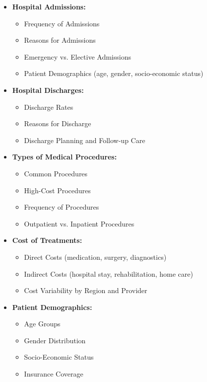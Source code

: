 \documentclass{article}
\begin{document}
\begin{itemize}
    \item \textbf{Hospital Admissions:}
    \begin{itemize}
        \item Frequency of Admissions
        \item Reasons for Admissions
        \item Emergency vs. Elective Admissions
        \item Patient Demographics (age, gender, socio-economic status)
    \end{itemize}
    
    \item \textbf{Hospital Discharges:}
    \begin{itemize}
        \item Discharge Rates
        \item Reasons for Discharge
        \item Discharge Planning and Follow-up Care
    \end{itemize}
    
    \item \textbf{Types of Medical Procedures:}
    \begin{itemize}
        \item Common Procedures
        \item High-Cost Procedures
        \item Frequency of Procedures
        \item Outpatient vs. Inpatient Procedures
    \end{itemize}
    
    \item \textbf{Cost of Treatments:}
    \begin{itemize}
        \item Direct Costs (medication, surgery, diagnostics)
        \item Indirect Costs (hospital stay, rehabilitation, home care)
        \item Cost Variability by Region and Provider
    \end{itemize}
    
    \item \textbf{Patient Demographics:}
    \begin{itemize}
        \item Age Groups
        \item Gender Distribution
        \item Socio-Economic Status
        \item Insurance Coverage
    \end{itemize}
    

\end{itemize}
\end{document}

